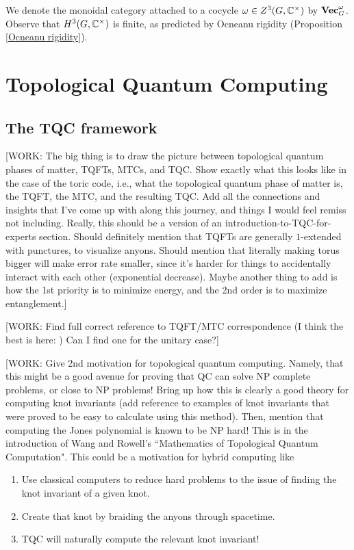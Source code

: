 \documentclass{article}
\theoremstyle{definition}
\numberwithin{figure}{section}
\begin{document}
We denote the monoidal category attached to a cocycle $\omega\in Z^3(G,\mathbb{C}^\times)$ by $\bold{Vec}_G^\omega$. Observe that $H^3(G,\mathbb{C}^\times)$ is finite, as predicted by Ocneanu rigidity (Proposition \ref{Ocneanu rigidity}).

\section{Topological Quantum Computing}
\label{Topological Quantum Computing}

\subsection{The TQC framework}
\label{The TQC framework}

[WORK: The big thing is to draw the picture between topological quantum phases of matter, TQFTs, MTCs, and TQC. Show exactly what this looks like in the case of the toric code, i.e., what the topological quantum phase of matter is, the TQFT, the MTC, and the resulting TQC. Add all the connections and insights that I've come up with along this journey, and things I would feel remiss not including. Really, this should be a version of an introduction-to-TQC-for-experts section. Should definitely mention that TQFTs are generally $1$-extended with punctures, to visualize anyons. Should mention that literally making torus bigger will make error rate smaller, since it's harder for things to accidentally interact with each other (exponential decrease). Maybe another thing to add is how the 1st priority is to minimize energy, and the 2nd order is to maximize entanglement.]


[WORK: Find full correct reference to TQFT/MTC correspondence (I think the best is here: \cite{bartlett2015modular}) Can I find one for the unitary case?]

[WORK: Give 2nd motivation for topological quantum computing. Namely, that this might be a good avenue for proving that QC can solve NP complete problems, or close to NP problems! Bring up how this is clearly a good theory for computing knot invariants (add reference to examples of knot invariants that were proved to be easy to calculate using this method). Then, mention that computing the Jones polynomial is known to be NP hard! This is in the introduction of Wang and Rowell's ``Mathematics of Topological Quantum Computation". This could be a motivation for hybrid computing like

\begin{enumerate}
\item Use classical computers to reduce hard problems to the issue of finding the knot invariant of a given knot.
\item Create that knot by braiding the anyons through spacetime.
\item TQC will naturally compute the relevant knot invariant!
\end{enumerate}
\end{document}
